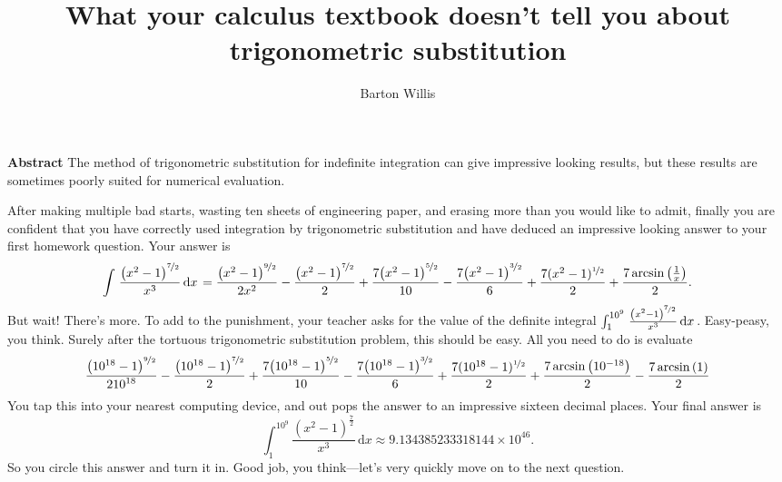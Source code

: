 \documentclass[12pt,fleqn]{article}
\title{What your calculus textbook doesn't tell you about trigonometric substitution}
\author{Barton Willis}
\newcounter{ex}\setcounter{ex}{0}
\begin{document}
\maketitle

\begin{shaded}
  \noindent \textbf{Abstract} The method of trigonometric substitution for indefinite
  integration can give impressive looking results, but these results 
  are sometimes poorly suited for numerical evaluation.
\end{shaded}

After making multiple bad starts, wasting ten sheets of engineering paper, 
 and erasing more  than you would like to admit, finally you are confident 
 that you have correctly used integration by trigonometric substitution and have
 deduced an impressive looking answer to your first homework question. Your answer
 is
 \begin{equation*}
    \int {\left. \frac{{{\left( {{x}^{2}}-1\right) }^{\nicefrac{7}{2}}}}{{{x}^{3}}} \, \mathrm{d}x\right.}=\frac{{{\left( {{x}^{2}}-1\right) }^{\nicefrac{9}{2}}}}{2 {{x}^{2}}}-\frac{{{\left( {{x}^{2}}-1\right) }^{\nicefrac{7}{2}}}}{2}+\frac{7 {{\left( {{x}^{2}}-1\right) }^{\nicefrac{5}{2}}}}{10}-\frac{7 {{\left( {{x}^{2}}-1\right) }^{\nicefrac{3}{2}}}}{6}+\frac{7 (x^2-1)^{\nicefrac{1}{2}}}{2}+\frac{7 \operatorname{arcsin}\left( \frac{1}{x}\right) }{2}.
\end{equation*}
But wait! There's more. To add to the punishment, your teacher asks for the value of  
the definite integral $\int_1^{10^9} {\left. \frac{{{\left( {{x}^{2}}-1\right) }^{\nicefrac{7}{2}}}}{{{x}^{3}}} \, \mathrm{d}x\right.}$. Easy-peasy, you think.
Surely after the tortuous trigonometric substitution problem, this should be easy. 
All you need to do is evaluate
\begin{equation*}
  \frac{{{\left( {{10}^{18}}-1\right) }^{\nicefrac{9}{2}}}}{2 {{10}^{18}}}-\frac{{{\left( {{10}^{18}}-1\right) }^{\nicefrac{7}{2}}}}{2}+\frac{7 {{\left( {{10}^{18}}-1\right) }^{\nicefrac{5}{2}}}}{10}-\frac{7 {{\left( {{10}^{18}}-1\right) }^{\nicefrac{3}{2}}}}{6}+\frac{7 (10^{18}-1)^{\nicefrac{1}{2}}}{2}+\frac{7 \operatorname{arcsin}\left( 10^{-18}\right) }{2}
    - \frac{7 \operatorname{arcsin}\left( 1 \right) }{2}
\end{equation*}
You tap this into your nearest computing device, and out  pops the answer to an 
impressive sixteen decimal places. Your final answer is
\begin{equation*}
    \int_1^{10^9} {\left. \frac{{{\left( {{x}^{2}}-1\right) }^{\frac{7}{2}}}}{{{x}^{3}}} \, \mathrm{d}x\right.}
       \approx 9.134385233318144 \times {{10}^{46}}.
\end{equation*}
So you circle this answer and turn it in. Good job, you think---let's very quickly move on to the 
next question.
\end{document}
